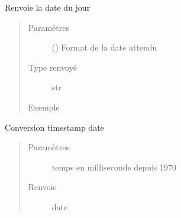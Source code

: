 \documentclass[letterpaper,10pt,french]{sphinxmanual}
\begin{document}
\begin{fulllineitems}
\label{\detokenize{modules/dtemng:toolbox.dtemng.today}}
Renvoie la date du jour
\begin{quote}\begin{description}
\item[{Paramètres}] \leavevmode
{} () \textendash{} Format de la date attendu

\item[{Type renvoyé}] \leavevmode
str

\item[{Exemple}] \leavevmode
\begin{sphinxVerbatim}[commandchars=\\\{\}]
 
\end{sphinxVerbatim}

\end{description}\end{quote}

\end{fulllineitems}


\begin{fulllineitems}
\label{\detokenize{modules/dtemng:toolbox.dtemng.tsdate}}
Conversion timestamp \sphinxhyphen{} date
\begin{quote}\begin{description}
\item[{Paramètres}] \leavevmode
{} \textendash{} temps en milliseconde depuis 1970

\item[{Renvoie}] \leavevmode
date

\end{description}\end{quote}

\end{fulllineitems}
\end{document}
